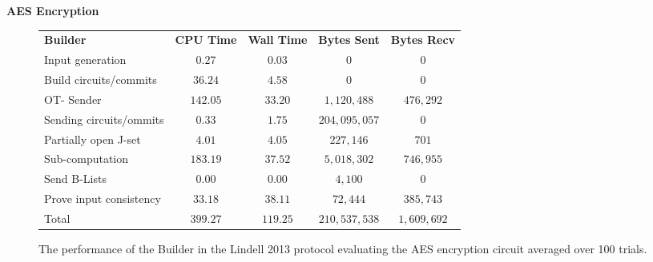 \documentclass[ %
                    author={Nicholas Tutte},
                supervisor={Prof. Nigel Smart},
                    degree={MEng},
                     title={Secure Two Party Computation},
                  subtitle={A practical comparison of recent protocols},
                      type={Research - GG1K},
                      year={2015} ]{dissertation}
\begin{document}
				\FloatBarrier
				\noindent \textbf{AES Encryption}
				\begin{figure}[!ht]
					\begin{tabular}{| p{4.3cm} | c c c c |}
						\hline
						\textbf{Builder} & \textbf{CPU Time} & \textbf{Wall Time} & \textbf{Bytes Sent} & \textbf{Bytes Recv} \\
						\thickhline
						Input generation & $0.27$ & $0.03$ & $0$ & $0$ \\
						\hline
						Build circuits/commits & $36.24$ & $4.58$ & $0$ & $0$ \\
						\hline
						OT- Sender & $142.05$ & $33.20$ & $1,120,488$ & $476,292$ \\
						\hline
						Sending circuits/ommits & $0.33$ & $1.75$ & $204,095,057$ & $0$ \\
						\hline
						Partially open J-set & $4.01$ & $4.05$ & $227,146$ & $701$ \\
						\hline
						Sub-computation & $183.19$ & $37.52$ & $5,018,302$ & $746,955$ \\
						\hline
						Send B-Lists & $0.00$ & $0.00$ & $4,100$ & $0$ \\
						\hline
						Prove input consistency & $33.18$ & $38.11$ & $72,444$ & $385,743$ \\
						\thickhline
						Total & $399.27$ & $119.25$ & $210,537,538$ & $1,609,692$ \\
						\hline
					\end{tabular}
					\caption{The performance of the Builder in the Lindell 2013 protocol evaluating the AES encryption circuit averaged over 100 trials. \label{table:L_2013_AES_Builder}}
				\end{figure}
\end{document}
